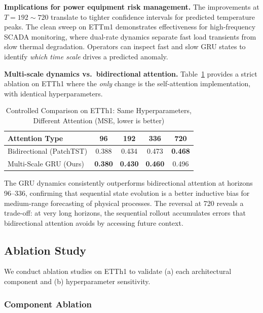\documentclass[conference]{IEEEtran}
\begin{document}
\textbf{Implications for power equipment risk management.}
The improvements at $T{=}192{\sim}720$ translate to tighter confidence intervals for predicted temperature peaks. The clean sweep on ETTm1 demonstrates effectiveness for high-frequency SCADA monitoring, where dual-rate dynamics separate fast load transients from slow thermal degradation. Operators can inspect fast and slow GRU states to identify \emph{which time scale} drives a predicted anomaly.

\textbf{Multi-scale dynamics vs.\ bidirectional attention.} Table~\ref{tab:ctrl} provides a strict ablation on ETTh1 where the \emph{only} change is the self-attention implementation, with identical hyperparameters.

\begin{table}[htbp]
\caption{Controlled Comparison on ETTh1: Same Hyperparameters, Different Attention (MSE, lower is better)}
\begin{center}
{\small
\begin{tabular}{lcccc}
\toprule
Attention Type & 96 & 192 & 336 & 720 \\
\midrule
Bidirectional (PatchTST) & 0.388 & 0.434 & 0.473 & \textbf{0.468} \\
Multi-Scale GRU (Ours) & \textbf{0.380} & \textbf{0.430} & \textbf{0.460} & 0.496 \\
\bottomrule
\end{tabular}
}
\label{tab:ctrl}
\end{center}
\end{table}

The GRU dynamics consistently outperforms bidirectional attention at horizons 96--336, confirming that sequential state evolution is a better inductive bias for medium-range forecasting of physical processes. The reversal at 720 reveals a trade-off: at very long horizons, the sequential rollout accumulates errors that bidirectional attention avoids by accessing future context.

\subsection{Ablation Study}

We conduct ablation studies on ETTh1 to validate (a) each architectural component and (b) hyperparameter sensitivity.

\subsubsection{Component Ablation}
\end{document}
